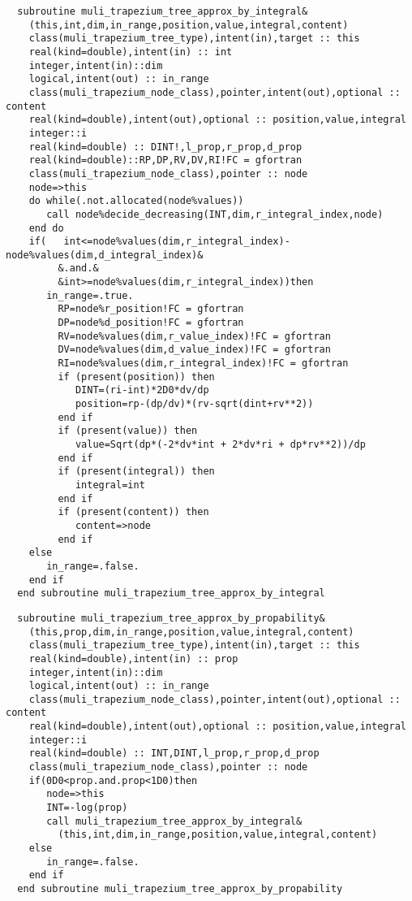 \begin{Verbatim}
  subroutine muli_trapezium_tree_approx_by_integral&
    (this,int,dim,in_range,position,value,integral,content)
    class(muli_trapezium_tree_type),intent(in),target :: this
    real(kind=double),intent(in) :: int
    integer,intent(in)::dim
    logical,intent(out) :: in_range
    class(muli_trapezium_node_class),pointer,intent(out),optional :: content
    real(kind=double),intent(out),optional :: position,value,integral
    integer::i
    real(kind=double) :: DINT!,l_prop,r_prop,d_prop
    real(kind=double)::RP,DP,RV,DV,RI!FC = gfortran
    class(muli_trapezium_node_class),pointer :: node
    node=>this
    do while(.not.allocated(node%values))
       call node%decide_decreasing(INT,dim,r_integral_index,node)
    end do
    if(   int<=node%values(dim,r_integral_index)-node%values(dim,d_integral_index)&
         &.and.&
         &int>=node%values(dim,r_integral_index))then
       in_range=.true.
         RP=node%r_position!FC = gfortran
         DP=node%d_position!FC = gfortran
         RV=node%values(dim,r_value_index)!FC = gfortran
         DV=node%values(dim,d_value_index)!FC = gfortran
         RI=node%values(dim,r_integral_index)!FC = gfortran
         if (present(position)) then
            DINT=(ri-int)*2D0*dv/dp
            position=rp-(dp/dv)*(rv-sqrt(dint+rv**2))
         end if
         if (present(value)) then
            value=Sqrt(dp*(-2*dv*int + 2*dv*ri + dp*rv**2))/dp
         end if
         if (present(integral)) then
            integral=int
         end if
         if (present(content)) then
            content=>node
         end if
    else
       in_range=.false.
    end if
  end subroutine muli_trapezium_tree_approx_by_integral
\end{Verbatim}

\begin{Verbatim}
  subroutine muli_trapezium_tree_approx_by_propability&
    (this,prop,dim,in_range,position,value,integral,content)
    class(muli_trapezium_tree_type),intent(in),target :: this
    real(kind=double),intent(in) :: prop
    integer,intent(in)::dim
    logical,intent(out) :: in_range
    class(muli_trapezium_node_class),pointer,intent(out),optional :: content
    real(kind=double),intent(out),optional :: position,value,integral
    integer::i
    real(kind=double) :: INT,DINT,l_prop,r_prop,d_prop
    class(muli_trapezium_node_class),pointer :: node
    if(0D0<prop.and.prop<1D0)then
       node=>this
       INT=-log(prop)
       call muli_trapezium_tree_approx_by_integral&
         (this,int,dim,in_range,position,value,integral,content)
    else
       in_range=.false.
    end if
  end subroutine muli_trapezium_tree_approx_by_propability
\end{Verbatim}

